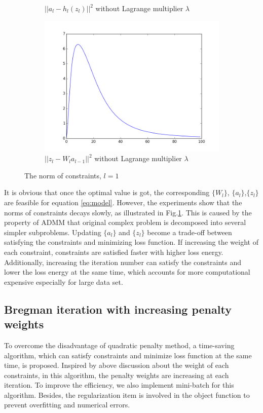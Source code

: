 \documentclass[letterpaper, 10 pt, conference]{ieeeconf}  %
\begin{document}
\begin{figure}
\begin{subfigure}{0.8\columnwidth}
\caption{$||a_l-h_l(z_l)||^2$ without Lagrange multiplier $\lambda$}
\end{subfigure}
\begin{subfigure}{0.8\columnwidth}
\centering
\includegraphics[width=0.7\columnwidth]{figure/zConstraint_no_lambda.png}
\caption{$||z_l-W_la_{l-1}||^2$ without Lagrange multiplier $\lambda$}
\end{subfigure}
\caption{The norm of constraints, $l=1$}
\label{fig:cmpCons}
\end{figure}

It is obvious that once the optimal value is got, the corresponding $\{W_l\}$, $\{a_l\}$,$\{z_l\}$ are feasible for equation \eqref{eq:model}. However, the experiments show that the norms of constraints decays slowly, as illustrated in Fig.\ref{fig:cmpCons}. This is caused by the property of ADMM that original complex problem is decomposed into several simpler subproblems. Updating $\{a_l\}$ and $\{z_l\}$ become a trade-off between satisfying the constraints and minimizing loss function. If increasing the weight of each constraint, constraints are satisfied faster with higher loss energy. Additionally, increasing the iteration number can satisfy the constraints and lower the loss energy at the same time, which accounts for more computational expensive especially for large data set.

\subsection{Bregman iteration with increasing penalty weights}
To overcome the disadvantage of quadratic penalty method, a time-saving algorithm, which can satisfy constraints and minimize loss function at the same time, is proposed. Inspired by above discussion about the weight of each constraints, in this algorithm, the penalty weights are increasing at each iteration. To improve the efficiency, we also implement mini-batch for this algorithm. Besides, the regularization item is involved in the object function to prevent overfitting and numerical errors.
\end{document}
